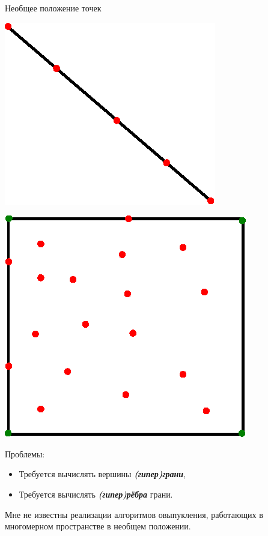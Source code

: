 \documentclass{beamer}
\begin{document}
\begin{frame}{Необщее положение точек}
     \begin{minipage}{.49\textwidth}
     \centering
     \includegraphics[width=0.8\linewidth]{line.eps}
   \end{minipage}
   \begin{minipage}{.49\textwidth}
     \centering
     \includegraphics[width=0.8\linewidth]{cube12.eps}
   \end{minipage}

   \bigskip

   Проблемы:
   \begin{itemize}
    \item  Требуется вычислять вершины \textbf{\textit{(гипер)грани}},
    \item  Требуется вычислять \textbf{\textit{(гипер)рёбра}} грани.
    \end{itemize}
   \vfill
   Мне не известны реализации алгоритмов овыпукления, работающих в многомерном пространстве в необщем положении.
 \end{frame}
\end{document}
